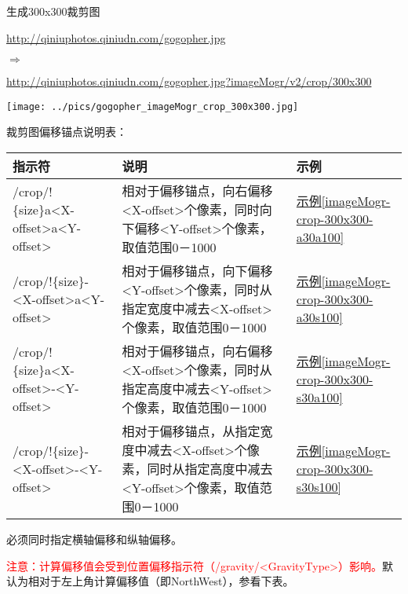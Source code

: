 \documentclass[11pt, oneside]{book}
\newcommand{\qpar}[1]{
\vspace{0.25em}
\noindent
#1\par
\vspace{0.25em}
}
\newcommand{\qurl}[1]{\footnotesize\url{#1}\normalsize}
\newcommand{\qtable}[1]{\footnotesize\vspace{0.5em}#1\vspace{0.5em}\normalsize}
\newcommand{\qsample}[1]{\hyperref[#1]{示例\ref*{#1}}}
\begin{document}
\begin{CJK*}{UTF8}{song}
\begin{sample}
  \caption{生成300x300裁剪图}
    \qpar{\qurl{http://qiniuphotos.qiniudn.com/gogopher.jpg}}
    \qpar{$\Rightarrow$}
    \qpar{\qurl{http://qiniuphotos.qiniudn.com/gogopher.jpg?imageMogr/v2/crop/300x300}}

    \begin{center}
      \texttt{[image: ../pics/gogopher\_imageMogr\_crop\_300x300.jpg]}
    \end{center}
  \label{imageMogr-crop-300x300}
\end{sample}

\qpar{裁剪图偏移锚点说明表：}
\qtable{
\label{offset-anchor-spec}
\begin{tabular}[t]{|l|p{18em}|p{4em}|}
\hline
指示符 & 说明 & 示例 \\
\hline
/crop/!\{size\}a\textless X-offset\textgreater a\textless Y-offset\textgreater & 相对于偏移锚点，向右偏移\textless X-offset\textgreater 个像素，同时向下偏移\textless Y-offset\textgreater 个像素，取值范围0－1000 & \qsample{imageMogr-crop-300x300-a30a100} \\
\hline
/crop/!\{size\}-\textless X-offset\textgreater a\textless Y-offset\textgreater & 相对于偏移锚点，向下偏移\textless Y-offset\textgreater 个像素，同时从指定宽度中减去\textless X-offset\textgreater 个像素，取值范围0－1000 & \qsample{imageMogr-crop-300x300-a30s100} \\
\hline
/crop/!\{size\}a\textless X-offset\textgreater -\textless Y-offset\textgreater & 相对于偏移锚点，向右偏移\textless X-offset\textgreater 个像素，同时从指定高度中减去\textless Y-offset\textgreater 个像素，取值范围0－1000 & \qsample{imageMogr-crop-300x300-s30a100} \\
\hline
/crop/!\{size\}-\textless X-offset\textgreater -\textless Y-offset\textgreater & 相对于偏移锚点，从指定宽度中减去\textless X-offset\textgreater 个像素，同时从指定高度中减去\textless Y-offset\textgreater 个像素，取值范围0－1000 & \qsample{imageMogr-crop-300x300-s30s100} \\
\hline
\end{tabular}
}

\qpar{必须同时指定横轴偏移和纵轴偏移。}
\qpar{\textcolor{red}{注意：计算偏移值会受到位置偏移指示符（/gravity/\textless GravityType\textgreater）影响。}默认为相对于左上角计算偏移值（即NorthWest），参看下表。}

\clearpage


\end{CJK*}
\end{document}
